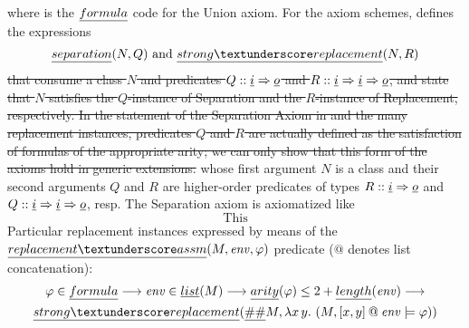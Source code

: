 where  is the $\formula$ code for the
Union axiom. For the axiom schemes,  defines
the expressions
\[
  \isa{separation}(N,Q)
  \text{ and }
  \isa{strong{\uscore}replacement}(N,R)
\]
\sout{that consume a class $N$ and predicates $Q::\tyi\fun\tyo$ and $R::\tyi\fun\tyi\fun\tyo$, and state that $N$
satisfies the $Q$-instance of Separation and the $R$-instance of
Replacement, respectively.
In the statement of the Separation Axiom in
 and
the many replacement instances, predicates $Q$ and $R$ are actually
defined as the satisfaction of formulas of the appropriate arity; we can only show
that this form of the axioms hold in generic extensions.}
whose first argument $N$ is a class and their second arguments $Q$ and
$R$ are higher-order predicates of types $R :: \tyi \fun \tyo$ and $Q ::
\tyi \fun \tyi \fun \tyo$, resp.
The Separation axiom is axiomatized like
\[
  \text{This}
\]
Particular replacement instances expressed by means of the
$\isa{replacement{\uscore}assm}(M,\mathit{env},\phi)$ predicate ($@$ denotes
list concatenation):
\begin{multline}\label{eq:replacement_assm_def}
\varphi \in \formula  \limp \mathit{env} \in \isa{list}(M) \limp \isa{arity}(\varphi) \leq 2+ \isa{length}(\mathit{env}) \limp \\
 \isa{strong{\uscore}replacement}(\isa{\#\#} M, \lambda x\, y.\ (M, [x,y]
\mathbin{@} \mathit{env}  \models \varphi))
\end{multline}
